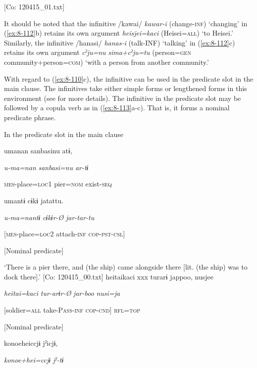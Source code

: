       [Co: 120415\_01.txt]
\z

It should be noted that the infinitive /kawai/ \textit{kawar-i} (change-\textsc{inf}) ‘changing’ in (\ref{ex:8-112}b) retains its own argument \textit{heisjei=kaci} (Heisei=\textsc{all}) ‘to Heisei.’ Similarly, the infinitive /hanasi/ \textit{hanas-i} (talk-INF) ‘talking’ in (\ref{ex:8-112}c) retains its own argument \textit{cˀju=nu} \textit{sima+cˀju=tu} (person=\textsc{gen} community+person=\textsc{com}) ‘with a person from another community.’

  With regard to (\ref{ex:8-110}c), the infinitive can be used in the predicate slot in the main clause. The infinitives take either simple forms or lengthened forms in this environment (see  for more details). The infinitive in the predicate slot may be followed by a copula verb as in (\ref{ex:8-113}a-c). That is, it forms a nominal predicate phrase.

\ea\label{ex:8-113}
  In the predicate slot in the main clause


    {\TM}
\glll  umanan  sanbasinu  atɨ,

      \textit{u-ma=nan}  \textit{sanbasi=nu}  \textit{ar-tɨ}

      \textsc{mes}-place=\textsc{loc}1  pier=\textsc{nom}  exist-\textsc{seq}

      umantɨ  cɨkɨ  jatattu.

      \textit{u-ma=nantɨ}  \textit{cɨkɨr-Ø}  \textit{jar-tar-tu}

      [\textsc{mes}-place=\textsc{loc}2  attach-\textsc{inf}  \textsc{cop}-\textsc{pst}-\textsc{csl}]

      [Nominal predicate]

\glt ‘There is a pier there, and (the ship) came alongside there [lit. (the ship) was to dock there].’ [Co: 120415\_00.txt]
\ex {\TM}
\glll  {\textbar}heitai{\textbar}kaci  xxx  turarɨ  jappoo,  nusjee

      \textit{heitai=kaci}    \textit{tur-arɨr-Ø}  \textit{jar-boo}  \textit{nusi=ja}

      [soldier=\textsc{all}    take-P\textsc{ass}-\textsc{inf}  \textsc{cop}-\textsc{cnd}]  \textsc{rfl}=\textsc{top}

      [Nominal predicate]  

      {\textbar}konoehei{\textbar}ccjɨ  jˀicjɨ,  

      \textit{konoe+hei=ccjɨ}  \textit{jˀ-tɨ}  

